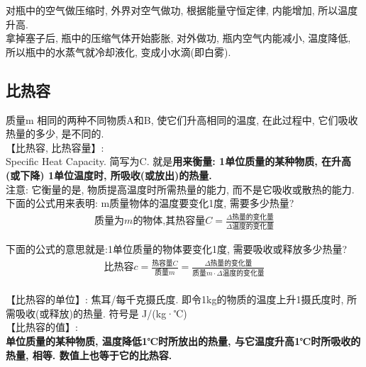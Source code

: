 \documentclass[UTF8]{ctexart}
\begin{document}
	\begin{tcolorbox}[title = {例},boxrule={0.1em},colframe={black!10}, colback={black!3},colbacktitle={black!10},coltitle={black}]
	对瓶中的空气做压缩时, 外界对空气做功, 根据能量守恒定律, 内能增加, 所以温度升高. \\
	拿掉塞子后, 瓶中的压缩气体开始膨胀, 对外做功, 瓶内空气内能减小, 温度降低, 所以瓶中的水蒸气就冷却液化, 变成小水滴(即白雾).
	\end{tcolorbox}
	
	
\vspace{1em} 



\subsection{比热容}

质量m 相同的两种不同物质A和B, 使它们升高相同的温度, 在此过程中, 它们吸收热量的多少, 是不同的. \\




【比热容, 比热容量】: \\
Specific Heat Capacity. 简写为C. 就是\textbf{用来衡量: 1单位质量的某种物质, 在升高(或下降) 1单位温度时, 所吸收(或放出)的热量.}  \\
注意: 它衡量的是, 物质提高温度时所需热量的能力, 而不是它吸收或散热的能力. \\

下面的公式用来表明: m质量物体的温度要变化1度, 需要多少热量?
\begin{align*}
	\boxed{
		\text{质量为}m\text{的物体,其热容量}C=\frac{\varDelta \text{热量的变化量}}{\varDelta \text{温度的变化量}}
	}
\end{align*}  

下面的公式的意思就是:1单位质量的物体要变化1度, 需要吸收或释放多少热量?
\begin{align*}
	\boxed{
		\text{比热容}c=\frac{\text{热容量}C}{\text{质量}m}=\frac{\varDelta \text{热量的变化量}}{\text{质量}m\cdot \varDelta \text{温度的变化量}}		
	}
\end{align*} \\



【比热容的单位】: 焦耳/每千克摄氏度. 即令1kg的物质的温度上升1摄氏度时, 所需吸收(或释放)的热量. 符号是 J/(kg·℃) \\


【比热容的值】: \\
\textbf{单位质量的某种物质, 温度降低1℃时所放出的热量, 与它温度升高1℃时所吸收的热量, 相等. 数值上也等于它的比热容.} \\
\end{document}
